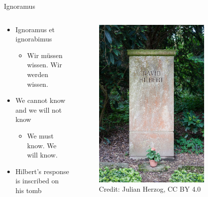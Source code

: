 \documentclass[utf8]{beamer}
\begin{document}
\begin{frame}{Ignoramus}
\begin{columns}
\begin{column}{0.6\textwidth}
\begin{itemize}
\item Ignoramus et ignorabimus
\begin{itemize}
\item Wir müssen wissen. Wir werden wissen.
\end{itemize}
\item We cannot know and we will not know
\begin{itemize}
\item We must know. We will know.
\end{itemize}
\item Hilbert's response is inscribed on his tomb
\end{itemize}
\end{column}
\begin{column}{0.4\textwidth}
\begin{figure}
\centering
\includegraphics[width=0.8\textwidth]{images/hilbert-tomb.jpg}
\\
\tiny Credit: Julian Herzog, CC BY 4.0
\end{figure}
\end{column}
\end{columns}
\end{frame}
\end{document}
